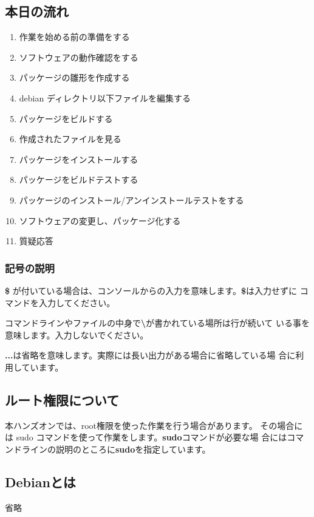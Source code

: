 \documentclass[mingoth,a4paper]{jsarticle}
\begin{document}
\subsection{本日の流れ}
\begin{enumerate}
\item 作業を始める前の準備をする
\item ソフトウェアの動作確認をする
\item パッケージの雛形を作成する
\item debian ディレクトリ以下ファイルを編集する
\item パッケージをビルドする
\item 作成されたファイルを見る
\item パッケージをインストールする
\item パッケージをビルドテストする
\item パッケージのインストール/アンインストールテストをする
\item ソフトウェアの変更し、パッケージ化する
\item 質疑応答
\end{enumerate}

\subsubsection{記号の説明}
{\bf \$} が付いている場合は、コンソールからの入力を意味します。{\bf \$}は入力せずに
コマンドを入力してください。

コマンドラインやファイルの中身で{\bf \textbackslash}が書かれている場所は行が続いて
いる事を意味します。入力しないでください。 

{\bf ...}は省略を意味します。実際には長い出力がある場合に省略している場
合に利用しています。

\subsection{ルート権限について}
本ハンズオンでは、root権限を使った作業を行う場合があります。
その場合には sudo コマンドを使って作業をします。{\bf sudo}コマンドが必要な場
合にはコマンドラインの説明のところに{\bf sudo}を指定しています。

\subsection{Debianとは}
省略
\end{document}
